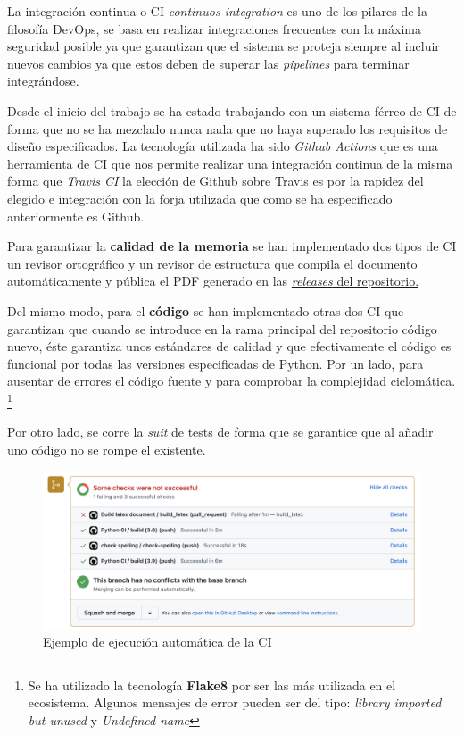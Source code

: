 La integración continua o CI \textit{continuos integration} es uno de los pilares de la
filosofía DevOps, se basa en realizar integraciones frecuentes con la máxima seguridad
posible ya que garantizan que el sistema se proteja siempre al incluir nuevos cambios ya
que estos deben de superar las \textit{pipelines} para terminar integrándose. 

Desde el inicio del trabajo se ha estado trabajando con un sistema férreo de CI de forma
que no se ha mezclado nunca nada que no haya superado los requisitos de diseño
especificados. La tecnología utilizada ha sido \textit{Github Actions} que es
una herramienta de CI que nos permite realizar una integración continua de la misma forma
que \textit{Travis CI} la elección de Github sobre Travis es por la rapidez del elegido e
integración con la forja utilizada que como se ha especificado anteriormente es Github.

Para garantizar la \textbf{calidad de la memoria} se han implementado dos tipos de CI\: un
revisor ortográfico y un revisor de estructura que compila el documento automáticamente y
pública el PDF generado en las
\href{https://github.com/pablojjimenez/TFG/releases}{\textit{releases} del repositorio.}

Del mismo modo, para el \textbf{código} se han implementado otras dos CI que garantizan
que cuando se introduce en la rama principal del repositorio código nuevo, éste garantiza
unos estándares de calidad y que efectivamente el código es funcional por todas las
versiones especificadas de Python. Por un lado, para ausentar de errores el código fuente
y para comprobar la complejidad ciclomática. \footnote{Se ha utilizado la tecnología
\textbf{Flake8} por ser las más utilizada en el ecosistema. Algunos mensajes de error
pueden ser del tipo: \textit{library imported but unused} y \textit{Undefined name} } 

Por otro lado, se corre la \textit{suit} de tests de forma que se garantice que al añadir
uno código no se rompe el existente. 

\FloatBarrier
\begin{figure}[h]
	\centering	
	\includegraphics[width=\textwidth]{doc/logos/imgs/CI-pr.png}
    \caption{Ejemplo de ejecución automática de la CI}
    \label{fig:tipos-de-cc}
\end{figure}
\FloatBarrier


